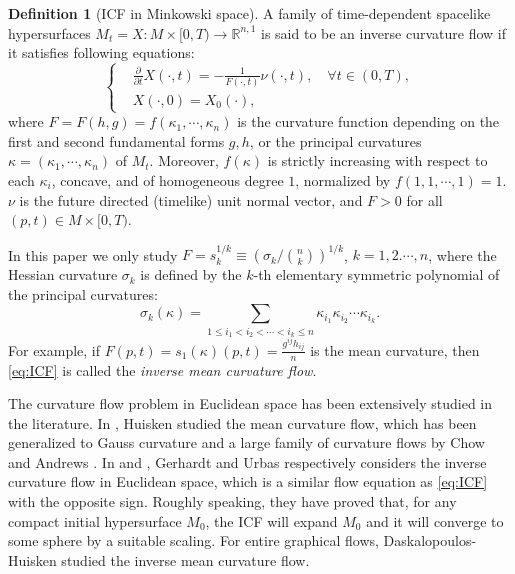 \documentclass[reqno]{amsart}
\theoremstyle{remark}
\newtheorem{remark}[theorem]{Remark}
\newcommand{\R}{\ensuremath{\mathbb{R}}}
\newcommand{\pd}[2]{\frac{\partial {#1}}{\partial {#2}}}
\theoremstyle{definition}
\newtheorem{definition}[theorem]{Definition}
\numberwithin{equation}{section}
\begin{document}
\begin{definition}[ICF in Minkowski space]
    A family of time-dependent spacelike hypersurfaces \(M_t = X:M\times [0,T) \to \R^{n,1}\) is said to be an inverse curvature flow if it satisfies following equations:
    \begin{equation}\label{eq:ICF}
        \left\{
        \begin{aligned}
        &\pd{}{t}X(\cdot,t) = -\frac{1}{F(\cdot,t)}\nu(\cdot,t),\quad \forall t\in (0,T), \\
        &X(\cdot,0)=X_0(\cdot), 
        \end{aligned}
        \right.
    \end{equation}
    where \(F = F(h,g) = f(\kappa_1,\cdots,\kappa_n)\) is  the curvature function depending on the first and second fundamental forms $g,h$, or the principal curvatures $\kappa=(\kappa_1,\cdots,\kappa_n)$ of $M_t$.  
 Moreover, $f(\kappa)$ is strictly increasing with respect to each \(\kappa_i\), concave, and of homogeneous degree \(1\), normalized by \(f(1,1,\cdots,1) = 1\). \(\nu\) is the future directed (timelike) unit normal vector, and \(F > 0\) for all \((p,t)\in M\times [0,T)\). 
\end{definition}
In this paper we only study \(F = s_k^{1/k}\equiv (\sigma_k / \binom{n}{k})^{1/k}\), \(k=1,2.\cdots,n\), where the Hessian curvature $\sigma_{k}$ is defined by the $k$-th  elementary symmetric polynomial of the principal curvatures:
\begin{equation*}
	\sigma_{k}(\kappa)=\sum_{1\leq i_{1}< i_{2}<\cdots< i_{k}\leq n}\kappa_{i_{1}}\kappa_{i_{2}}\cdots\kappa_{i_{k}}.
\end{equation*}
For example, if \(F(p,t) = s_1(\kappa)(p,t) = \frac{g^{ij}h_{ij}}{n}\) is the mean curvature, then \eqref{eq:ICF} is called the \textit{inverse mean curvature flow}.


The curvature flow problem in Euclidean space has been extensively studied in the literature. In \cite{Hui}, Huisken studied the mean curvature flow, which has been generalized to Gauss curvature and a large family of curvature flows by Chow \cite{Chow} and Andrews \cite{Pinching-estimates}.  In \cite{Ger} and \cite{Ur}, Gerhardt and Urbas respectively considers the inverse curvature flow in Euclidean space, which is a similar flow equation as \eqref{eq:ICF} with the opposite sign. Roughly speaking, they have proved that, for any compact initial hypersurface $M_0$, the ICF will expand $M_0$ and it will converge to some sphere by a suitable scaling. For entire graphical flows,  Daskalopoulos-Huisken \cite{DH} studied the inverse mean curvature flow. 
\end{document}
